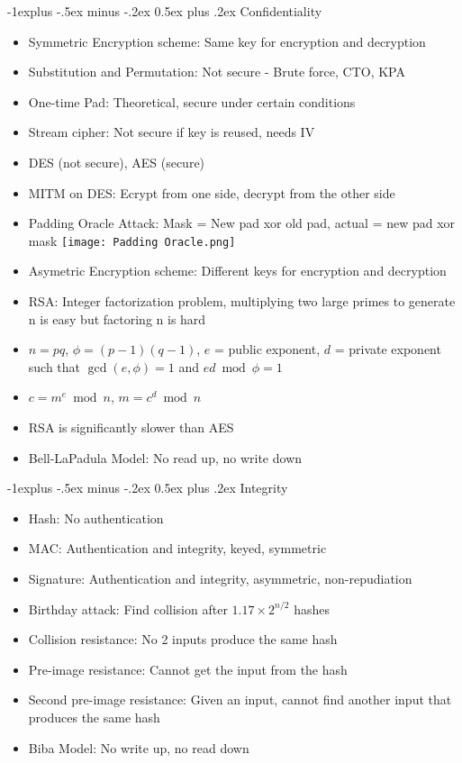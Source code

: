 \documentclass[10pt, landscape]{article}
\makeatletter
\renewcommand{\subsection}{\@startsection{subsection}{2}{0mm}%
                                {-1explus -.5ex minus -.2ex}%
                                {0.5ex plus .2ex}%
                                {\normalfont\normalsize\bfseries}}
\makeatother
\begin{document}
\begin{multicols*}{3}
\subsection{Confidentiality}
\begin{itemize}
	\item Symmetric Encryption scheme: Same key for encryption and decryption
	\item Substitution and Permutation: Not secure - Brute force, CTO, KPA
	\item One-time Pad: Theoretical, secure under certain conditions
	\item Stream cipher: Not secure if key is reused, needs IV 
	\item DES (not secure), AES (secure)
	\item MITM on DES: Ecrypt from one side, decrypt from the other side
	\item Padding Oracle Attack: Mask = New pad xor old pad, actual = new pad xor mask \texttt{[image: Padding Oracle.png]}
	\item Asymetric Encryption scheme: Different keys for encryption and decryption
	\item RSA: Integer factorization problem, multiplying two large primes to generate n is easy but factoring n is hard
	\item $n = pq$, $\phi = (p-1)(q-1)$, $e$ = public exponent, $d$ = private exponent such that $\gcd(e, \phi) = 1$ and $ed \bmod \phi = 1$
	\item $c = m^e \bmod n$, $m = c^d \bmod n$
	\item RSA is significantly slower than AES
	\item Bell-LaPadula Model: No read up, no write down
\end{itemize}

\subsection{Integrity}
\begin{itemize}
	\item Hash: No authentication
	\item MAC: Authentication and integrity, keyed, symmetric 
	\item Signature: Authentication and integrity, asymmetric, non-repudiation
	\item Birthday attack: Find collision after $1.17 \times 2^{n/2}$ hashes
	\item Collision resistance: No 2 inputs produce the same hash
	\item Pre-image resistance: Cannot get the input from the hash
	\item Second pre-image resistance: Given an input, cannot find another input that produces the same hash
	\item Biba Model: No write up, no read down
\end{itemize}


\end{multicols*}
\end{document}
